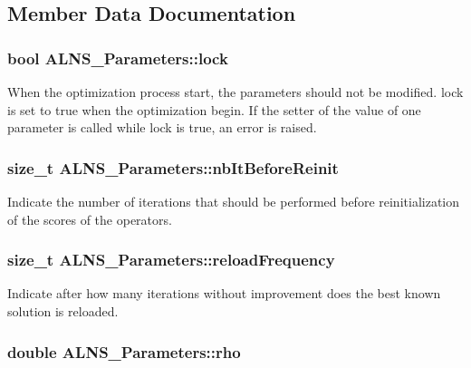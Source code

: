\subsection{Member Data Documentation}
\hypertarget{classALNS__Parameters_adda245fa6198a0d2875764fb4a8d0cde}{
\subsubsection[{lock}]{\setlength{\rightskip}{0pt plus 5cm}bool A\-L\-N\-S\-\_\-\-Parameters\-::lock\hspace{0.3cm}{\ttfamily [protected]}}}\label{classALNS__Parameters_adda245fa6198a0d2875764fb4a8d0cde}
When the optimization process start, the parameters should not be modified. lock is set to true when the optimization begin. If the setter of the value of one parameter is called while lock is true, an error is raised. \hypertarget{classALNS__Parameters_a71f14dea13400809264b6d80601e0bdd}{
\subsubsection[{nb\-It\-Before\-Reinit}]{\setlength{\rightskip}{0pt plus 5cm}size\-\_\-t A\-L\-N\-S\-\_\-\-Parameters\-::nb\-It\-Before\-Reinit\hspace{0.3cm}{\ttfamily [protected]}}}\label{classALNS__Parameters_a71f14dea13400809264b6d80601e0bdd}
Indicate the number of iterations that should be performed before reinitialization of the scores of the operators. \hypertarget{classALNS__Parameters_ab3c514956945f29a6dff9a77fd5cb3ea}{
\subsubsection[{reload\-Frequency}]{\setlength{\rightskip}{0pt plus 5cm}size\-\_\-t A\-L\-N\-S\-\_\-\-Parameters\-::reload\-Frequency\hspace{0.3cm}{\ttfamily [protected]}}}\label{classALNS__Parameters_ab3c514956945f29a6dff9a77fd5cb3ea}
Indicate after how many iterations without improvement does the best known solution is reloaded. \hypertarget{classALNS__Parameters_a4bf8967ee96b03fe872daf5da1a23782}{
\subsubsection[{rho}]{\setlength{\rightskip}{0pt plus 5cm}double A\-L\-N\-S\-\_\-\-Parameters\-::rho\hspace{0.3cm}{\ttfamily [protected]}}}\label{classALNS__Parameters_a4bf8967ee96b03fe872daf5da1a23782}
